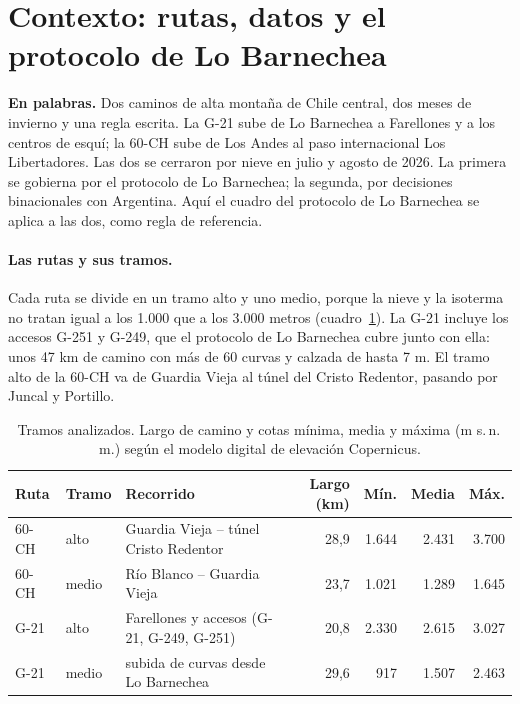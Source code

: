 \documentclass[11pt,a4paper]{article}
\newcommand{\enpalabras}[1]{%
  \par\smallskip\noindent\colorbox{caja}{\parbox{\dimexpr\linewidth-2\fboxsep}{\small\textbf{En palabras.} #1}}\par\smallskip}
\begin{document}
\section{Contexto: rutas, datos y el protocolo de Lo Barnechea}\label{sec:contexto}

\enpalabras{Dos caminos de alta montaña de Chile central, dos meses de invierno y una regla escrita. La G-21 sube de Lo Barnechea a Farellones y a los centros de esquí; la 60-CH sube de Los Andes al paso internacional Los Libertadores. Las dos se cerraron por nieve en julio y agosto de 2026. La primera se gobierna por el protocolo de Lo Barnechea; la segunda, por decisiones binacionales con Argentina. Aquí el cuadro del protocolo de Lo Barnechea se aplica a las dos, como regla de referencia.}

\paragraph{Las rutas y sus tramos.} Cada ruta se divide en un tramo alto y uno medio, porque la nieve y la isoterma no tratan igual a los 1.000 que a los 3.000 metros (cuadro~\ref{tab:tramos}). La G-21 incluye los accesos G-251 y G-249, que el protocolo de Lo Barnechea cubre junto con ella: unos 47 km de camino con más de 60 curvas y calzada de hasta 7 m. El tramo alto de la 60-CH va de Guardia Vieja al túnel del Cristo Redentor, pasando por Juncal y Portillo.

\begin{table}[H]
\centering\footnotesize\setlength{\tabcolsep}{4pt}
\caption{Tramos analizados. Largo de camino y cotas mínima, media y máxima (m s.\,n.\,m.) según el modelo digital de elevación Copernicus.}
\label{tab:tramos}
\begin{tabular}{|l|l|l|r|r|r|r|}
\hline
Ruta & Tramo & Recorrido & Largo (km) & Mín. & Media & Máx. \\ \hline
60-CH & alto & Guardia Vieja -- túnel Cristo Redentor & 28,9 & 1.644 & 2.431 & 3.700 \\ \hline
60-CH & medio & Río Blanco -- Guardia Vieja & 23,7 & 1.021 & 1.289 & 1.645 \\ \hline
G-21 & alto & Farellones y accesos (G-21, G-249, G-251) & 20,8 & 2.330 & 2.615 & 3.027 \\ \hline
G-21 & medio & subida de curvas desde Lo Barnechea & 29,6 & 917 & 1.507 & 2.463 \\ \hline
\end{tabular}
\end{table}
\end{document}
